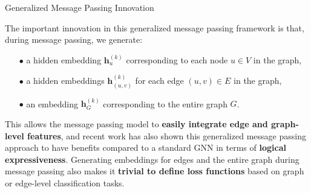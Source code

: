 \documentclass[10pt, aspectratio=169, compress, protectframetitle, handout]{beamer}
\begin{document}
\begin{frame}{Generalized Message Passing Innovation}

    The important innovation in this generalized message passing framework is that, during message passing, we generate:
    \begin{itemize}
    \item[\alert{$\bullet$}] a hidden embedding $\mathbf h^{(k)}_u$ corresponding to \alert{each node} $u \in V$ in the graph,
    \item[\alert{$\bullet$}] a hidden embeddings $\mathbf h_{(u,v)}^{(k)}$ for \alert{each edge} $(u, v) \in E$ in the graph,
    \item[\alert{$\bullet$}] an embedding $\mathbf h_G^{(k)}$ corresponding to the \alert{entire graph} $G$.
    \end{itemize}
    
    This allows the message passing model to \textbf{easily integrate edge and graph-level features}, and recent work has also shown this generalized message passing approach to have benefits compared to a standard GNN in terms of \textbf{logical expressiveness}. Generating embeddings for edges and the entire graph during message passing also makes it \textbf{trivial to define loss functions} based on graph or edge-level classification tasks.
    
\end{frame}
\end{document}
